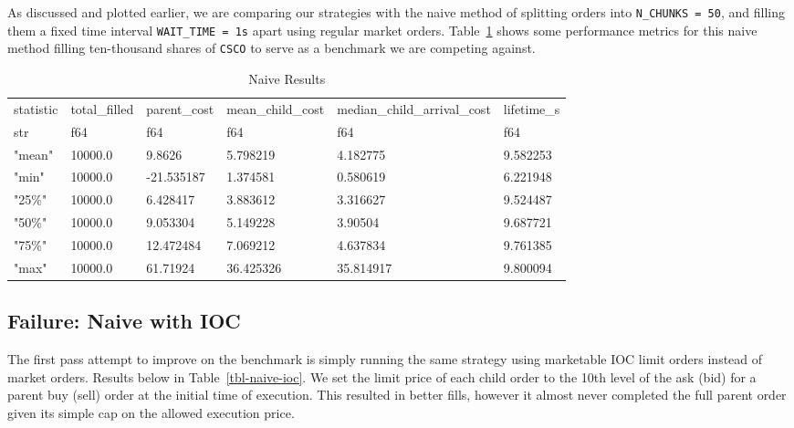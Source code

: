 \documentclass[
  letterpaper,
]{article}
\begin{document}
As discussed and plotted earlier, we are comparing our strategies with
the naive method of splitting orders into \texttt{N\_CHUNKS\ =\ 50}, and
filling them a fixed time interval \texttt{WAIT\_TIME\ =\ 1s} apart
using regular market orders. Table~\ref{tbl-naive} shows some
performance metrics for this naive method filling ten-thousand shares of
\texttt{CSCO} to serve as a benchmark we are competing against.

\begin{longtable}[]{@{}llllll@{}}

\caption{\label{tbl-naive}Naive Results}

\tabularnewline

\toprule\noalign{}
statistic & total\_filled & parent\_cost & mean\_child\_cost &
median\_child\_arrival\_cost & lifetime\_s \\
str & f64 & f64 & f64 & f64 & f64 \\
\midrule\noalign{}
\endhead
\bottomrule\noalign{}
\endlastfoot
"mean" & 10000.0 & 9.8626 & 5.798219 & 4.182775 & 9.582253 \\
"min" & 10000.0 & -21.535187 & 1.374581 & 0.580619 & 6.221948 \\
"25\%" & 10000.0 & 6.428417 & 3.883612 & 3.316627 & 9.524487 \\
"50\%" & 10000.0 & 9.053304 & 5.149228 & 3.90504 & 9.687721 \\
"75\%" & 10000.0 & 12.472484 & 7.069212 & 4.637834 & 9.761385 \\
"max" & 10000.0 & 61.71924 & 36.425326 & 35.814917 & 9.800094 \\

\end{longtable}

\subsection{Failure: Naive with IOC}\label{failure-naive-with-ioc}

The first pass attempt to improve on the benchmark is simply running the
same strategy using marketable IOC limit orders instead of market
orders. Results below in Table~\ref{tbl-naive-ioc}. We set the limit
price of each child order to the 10th level of the ask (bid) for a
parent buy (sell) order at the initial time of execution. This resulted
in better fills, however it almost never completed the full parent order
given its simple cap on the allowed execution price.
\end{document}
